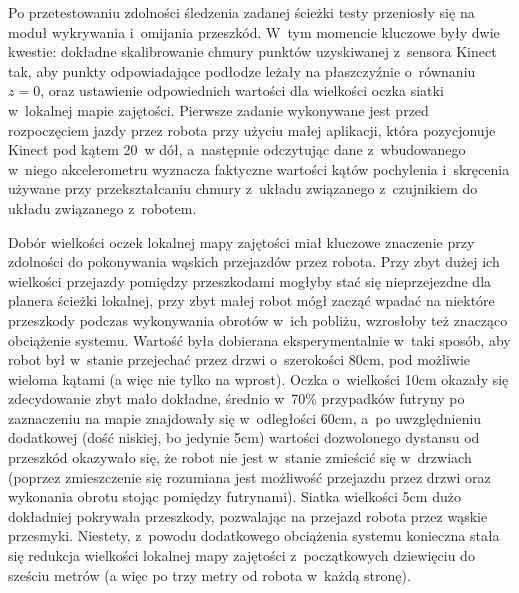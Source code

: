 Po przetestowaniu zdolności śledzenia zadanej ścieżki testy przeniosły się
na moduł wykrywania i~omijania przeszkód. W~tym momencie kluczowe były dwie
kwestie: dokładne skalibrowanie chmury punktów uzyskiwanej z~sensora Kinect
tak, aby punkty odpowiadające podłodze leżały na płaszczyźnie o~równaniu
$z=0$, oraz ustawienie odpowiednich wartości dla wielkości oczka siatki
w~lokalnej mapie zajętości. Pierwsze zadanie wykonywane jest przed rozpoczęciem
jazdy przez robota przy użyciu małej aplikacji, która pozycjonuje Kinect 
pod kątem 20\textdegree ~w dół, a~następnie odczytując dane z~wbudowanego 
w~niego akcelerometru wyznacza faktyczne wartości kątów pochylenia i~skręcenia
używane przy przekształcaniu chmury z~układu związanego z~czujnikiem do układu
związanego z~robotem. 

Dobór wielkości oczek lokalnej mapy zajętości miał kluczowe znaczenie przy zdolności
do pokonywania wąskich przejazdów przez robota. Przy zbyt dużej ich wielkości
przejazdy pomiędzy przeszkodami mogłyby stać się nieprzejezdne dla planera 
ścieżki lokalnej, przy zbyt małej robot mógł zacząć wpadać na niektóre przeszkody
podczas wykonywania obrotów w~ich pobliżu, wzrosłoby też znacząco obciążenie
systemu. Wartość była dobierana eksperymentalnie w~taki sposób, aby robot był
w~stanie przejechać przez drzwi o~szerokości 80cm, pod możliwie wieloma kątami
(a więc nie tylko na wprost). Oczka o~wielkości 10cm okazały się zdecydowanie 
zbyt mało dokładne, średnio w~70\% przypadków futryny po zaznaczeniu na mapie 
znajdowały się w~odległości 60cm, a~po uwzględnieniu dodatkowej (dość niskiej, 
bo jedynie 5cm) wartości dozwolonego dystansu od przeszkód okazywało się, że
robot nie jest w~stanie zmieścić się w~drzwiach (poprzez zmieszczenie się
rozumiana jest możliwość przejazdu przez drzwi oraz wykonania obrotu stojąc 
pomiędzy futrynami). Siatka wielkości 5cm dużo dokładniej pokrywała przeszkody,
pozwalając na przejazd robota przez wąskie przesmyki. Niestety, z~powodu dodatkowego 
obciążenia systemu konieczna stała się redukcja wielkości lokalnej mapy zajętości
z~początkowych dziewięciu do sześciu metrów (a więc po trzy metry od robota 
w~każdą stronę). 

